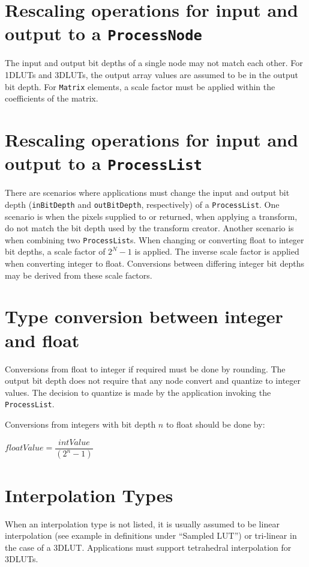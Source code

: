 \section{Rescaling operations for input and output to a \texttt{ProcessNode}}
The input and output bit depths of a single node may not match each other. For 1DLUTs and 3DLUTs, the output array values are assumed to be in the output bit depth. For \texttt{Matrix} elements, a scale factor must be applied within the coefficients of the matrix.

\section{Rescaling operations for input and output to a \texttt{ProcessList}}
There are scenarios where applications must change the input and output bit depth (\texttt{inBitDepth} and \texttt{outBitDepth}, respectively) of a \texttt{ProcessList}. One scenario is when the pixels supplied to or returned, when applying a transform, do not match the bit depth used by the transform creator. Another scenario is when combining two \texttt{ProcessList}s.  When changing or converting float to integer bit depths, a scale factor of $2^N-1$ is applied. The inverse scale factor is applied when converting integer to float.  Conversions between differing integer bit depths may be derived from these scale factors.

\section{Type conversion between integer and float}
Conversions from float to integer if required must be done by rounding. The output bit depth does not require that any node convert and quantize to integer values. The decision to quantize is made by the application invoking the \texttt{ProcessList}.

Conversions from integers with bit depth $n$ to float should be done by:

$floatValue =  \dfrac{intValue}{(2^n-1)}$

\section{Interpolation Types}
When an interpolation type is not listed, it is usually assumed to be linear interpolation (see example in definitions under “Sampled LUT”) or tri-linear in the case of a 3DLUT. Applications must support tetrahedral interpolation for 3DLUTs.

